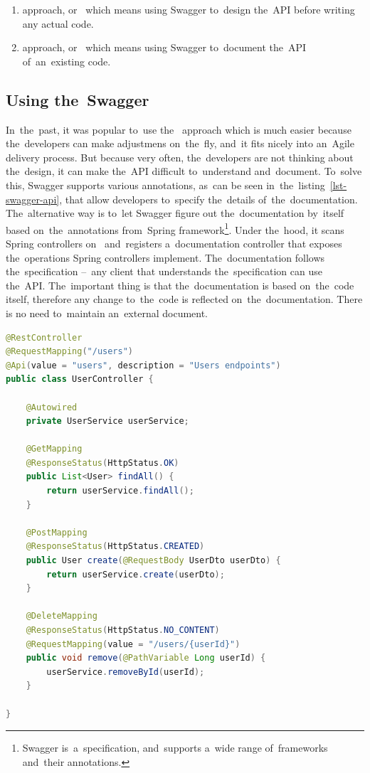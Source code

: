 \begin{enumerate}
  \item {} approach, or~ which means using Swagger
  to~design the~API before writing any actual code.
  \item {} approach, or~ which means using Swagger
  to~document the~API of~an~existing code.
\end{enumerate}


\subsection{Using the~Swagger}
In~the~past, it was popular to~use the~ approach which is much
easier because the~developers can make adjustmens on~the~fly, and~it fits nicely
into an~Agile delivery process. But because very often, the~developers are not
thinking about the~design, it can make the~API difficult to~understand
and~document. To~solve this, Swagger supports various annotations, as~can be
seen in~the~listing~\ref{lst-swagger-api}, that allow developers to~specify
the~details of~the~documentation. The~alternative way is to~let Swagger figure
out the~documentation by~itself based on~the~annotations from~Spring
framework\footnote{Swagger is~a~specification, and~supports a~wide range
of~frameworks and~their annotations.}. Under the~hood, it scans Spring
controllers on~ and~registers a~documentation controller that
exposes the~operations Spring controllers implement. The~documentation follows
the~specification --~any client that understands the~specification can use
the~API. The~important thing is that the~documentation is based on~the~code
itself, therefore any change to~the~code is reflected on~the~documentation.
There is no need to~maintain an~external document.

\vspace{1mm}
\begin{lstlisting}[caption=An~example of~Spring controller with Swagger's
annotations that can be used to~generate API documentation., style=dp-default,
language=Java, label=lst-swagger-api]
@RestController
@RequestMapping("/users")
@Api(value = "users", description = "Users endpoints")
public class UserController {

	@Autowired
	private UserService userService;
	
	@GetMapping
	@ResponseStatus(HttpStatus.OK)
	public List<User> findAll() {
		return userService.findAll();
	}
	
	@PostMapping
	@ResponseStatus(HttpStatus.CREATED)
	public User create(@RequestBody UserDto userDto) {
		return userService.create(userDto);
	}
	
	@DeleteMapping
	@ResponseStatus(HttpStatus.NO_CONTENT)
	@RequestMapping(value = "/users/{userId}")
	public void remove(@PathVariable Long userId) {
		userService.removeById(userId);
	}

}
\end{lstlisting}

